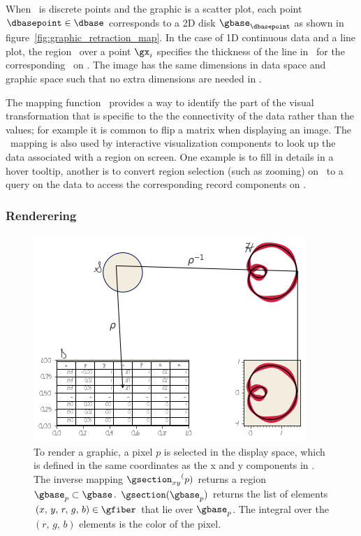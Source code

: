 \documentclass[../main.tex]{subfiles}
\begin{document}
When \dbase\ is discrete points and the graphic is a scatter plot, each point $\dbasepoint \in \dbase$ corresponds to a 2D disk $\gbase_{\dbasepoint}$ as shown in figure~\ref{fig:graphic_retraction_map}. In the case of 1D continuous data and a line plot, the region \gy\ over a point $\gx_i$ specifies the thickness of the line in \gbase\ for the corresponding \dsection\ on \dbasepoint. The image has the same dimensions in data space and graphic space such that no extra dimensions are needed in \gbase. 

The mapping function \vindex\ provides a way to identify the part of the visual transformation that is specific to the the connectivity of the data rather than the values; for example it is common to flip a matrix when displaying an image. The \vindex\ mapping is also used by interactive visualization components to look up the data associated with a region on screen.  One example is to fill in details in a hover tooltip, another is to convert region selection (such as zooming) on \gbase\ to a query on the data to access the corresponding record components on \dbase.

\subsubsection{Renderering \gsection}
\label{sec:graphic_section}
\begin{figure}
    \includegraphics[width=\textwidth]{figures/math/render.png}
    \caption{To render a graphic, a pixel $p$ is selected in the display space, which is defined in the same coordinates as the x and y components in \gfiber.  The inverse mapping ${\gsection_{xy}}^(p)$ returns a region $\gbase_{p} \subset \gbase$. $\gsection(\gbase_{p})$ returns the list of elements $(x,\,y,\,r,\,g,\,b) \in \gfiber$ that lie over $\gbase_{p}$. The integral over the $(r,\,g,\,b)$ elements is the color of the pixel.}
    \label{fig:graphic_rho_lookup}
\end{figure}
\end{document}
